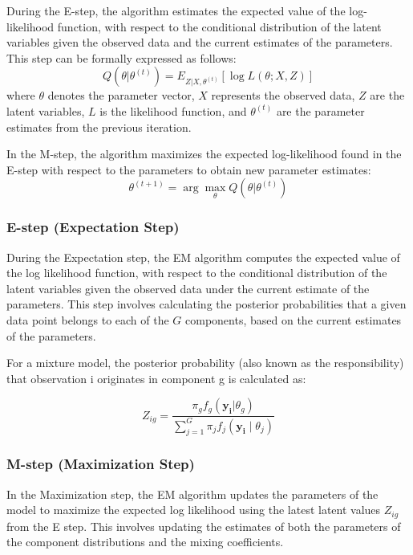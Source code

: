\documentclass{article}
\begin{document}
During the E-step, the algorithm estimates the expected value of the log-likelihood function, with respect to the conditional distribution of the latent variables given the observed data and the current estimates of the parameters. This step can be formally expressed as follows:
\begin{equation}
Q(\theta | \theta^{(t)}) = E_{Z|X,\theta^{(t)}}[\log L(\theta; X, Z)]
\end{equation}
where \( \theta \) denotes the parameter vector, \( X \) represents the observed data, \( Z \) are the latent variables, \( L \) is the likelihood function, and \( \theta^{(t)} \) are the parameter estimates from the previous iteration.

In the M-step, the algorithm maximizes the expected log-likelihood found in the E-step with respect to the parameters to obtain new parameter estimates:
\begin{equation}
\theta^{(t+1)} = \arg \max_{\theta} Q(\theta | \theta^{(t)})
\end{equation}

\subsubsection{E-step (Expectation Step)}

During the Expectation step, the EM algorithm computes the expected value of the log likelihood function, with respect to the conditional distribution of the latent variables given the observed data under the current estimate of the parameters. This step involves calculating the posterior probabilities that a given data point belongs to each of the $G$ components, based on the current estimates of the parameters.

For a mixture model, the posterior probability (also known as the responsibility) that observation i originates in component g is calculated as:

\begin{equation}
Z_{ig} = \frac{\pi_g f_g(\mathbf{y_i}|\theta_g)}{\sum_{j=1}^{G} \pi_j f_j(\mathbf{y_i} \mid \theta_j)}
\end{equation}

\subsubsection{M-step (Maximization Step)}

In the Maximization step, the EM algorithm updates the parameters of the model to maximize the expected log likelihood using the latest latent values $Z_{ig}$ from the E step. 
This involves updating the estimates of both the parameters of the component distributions and the mixing coefficients.
\end{document}
